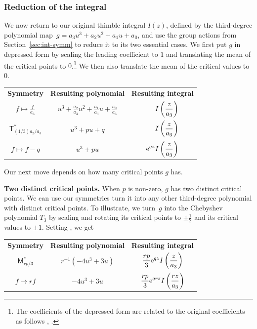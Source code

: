 \documentclass[pdftex]{sigma}
\numberwithin{equation}{section}
\begin{document}
\subsubsection{Reduction of the integral}
We now return to our original thimble integral $I(z)$, defined by the third-degree polynomial map~${ g = a_3 u^3 + a_2 u^2 + a_1 u + a_0}$,
and use the group actions from Section~\ref{sec:int-symm} to reduce it to its two essential cases. We first put $g$ in depressed form by scaling the leading coefficient to $1$ and translating the mean of the critical points to $0$.\footnote{The coefficients of the depressed form are related to the original coefficients as follows
, .
} We then also translate the mean of the critical values to $0$.
\begin{center}
\begin{tabular}{c|c|c}
\textbf{Symmetry} & \textbf{Resulting polynomial} & \textbf{Resulting integral} \\[2mm]
$\displaystyle f \mapsto \frac{f}{a_3}$ & $\displaystyle u^3 + \frac{a_2}{a_3} u^2 + \frac{a_1}{a_3} u + \frac{a_0}{a_3}$ & $\displaystyle \hphantom{{\rm e}^{qz}} I\left(\frac{z}{a_3}\right)$ \\[5mm]
$\displaystyle \mathsf{T}_{(1/3) a_2/a_3}^*$ & $\displaystyle u^3 + pu + q$ & $\displaystyle \hphantom{{\rm e}^{qz}} I\left(\frac{z}{a_3}\right)$ \\[5mm]
$\displaystyle f \mapsto f - q$ & $\displaystyle u^3 + pu$ & $\displaystyle {\rm e}^{qz} I\left(\frac{z}{a_3}\right)$ \\[5mm]
\end{tabular}
\end{center}
Our next move depends on how many critical points $g$ has.

 \textbf{Two distinct critical points.}
When $p$ is non-zero, $g$ has two distinct critical points. We can use our symmetries turn it into any other third-degree polynomial with distinct critical points. To illustrate, we turn~$g$ into the Chebyshev polynomial $T_3$ by scaling and rotating its critical points to $\pm\frac{1}{2}$ and its critical values to $\pm 1$. Setting
,
we get
\begin{center}
\begin{tabular}{c|c|c}
\textbf{Symmetry} & \textbf{Resulting polynomial} & \textbf{Resulting integral} \\[2mm]
$\displaystyle \mathsf{M}_{rp/3}^*$ & $\displaystyle r^{-1} \left(-4u^3 + 3u\right)$ & $\displaystyle \frac{rp}{3} {\rm e}^{qz} I\left(\frac{z}{a_3}\right)$ \\[5mm]
$\displaystyle f \mapsto rf$ & $\displaystyle -4u^3 + 3u$ & $\displaystyle \frac{rp}{3} {\rm e}^{qrz} I\left(\frac{rz}{a_3}\right)$ \\[5mm]
\end{tabular}
\end{center}
\end{document}
